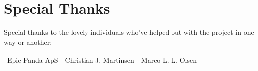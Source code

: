 \documentclass[a4paper]{book}
\begin{document}
\section*{Special Thanks}
Special thanks to the lovely individuals who've helped out with the project in one way or another:
\begin{center}
    \begin{tabular}{cccc}
        Epic Panda ApS & Christian J. Martinsen & Marco L. L. Olsen\\
    \end{tabular}
\end{center}

\tableofcontents
\mainmatter

\appendix


%
\end{document}

